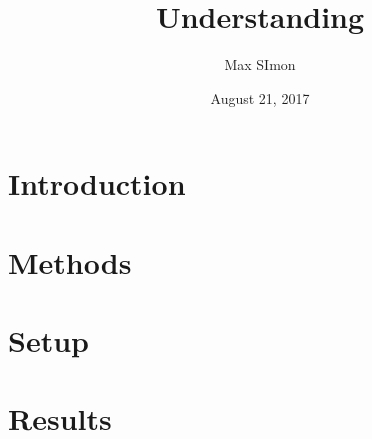 \documentclass[
12pt, %
parskip=half, %
digital, %
oneside, %
]{bsc}
\title{Understanding}
\author{Max SImon}
\date{August 21, 2017}
\begin{document}
	
\chapter{Introduction}


\chapter{Methods}



\chapter{Setup}

\chapter{Results}


\end{document}
